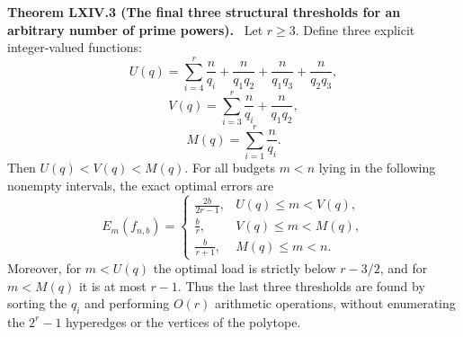 \documentclass[11pt,a4paper,oneside]{book}
\newcommand{\statement}[3]{\par\medskip\noindent\textbf{#1 #2 (#3).}\ }
\begin{document}
\statement{Theorem}{LXIV.3}{The final three structural thresholds for an arbitrary number of prime powers}
Let $r\ge3$. Define three explicit integer-valued functions:
\begin{equation}
U(q)=\sum_{i=4}^r\frac n{q_i}+\frac n{q_1q_2}+\frac n{q_1q_3}+\frac n{q_2q_3},\tag{415}
\end{equation}
\begin{equation}
V(q)=\sum_{i=3}^r\frac n{q_i}+\frac n{q_1q_2},\tag{416}
\end{equation}
\begin{equation}
M(q)=\sum_{i=1}^r\frac n{q_i}.\tag{417}
\end{equation}
Then $U(q)<V(q)<M(q)$. For all budgets $m<n$ lying in the following nonempty intervals, the exact optimal errors are
\begin{equation}
E_m(f_{n,b})=\begin{cases}
\displaystyle\frac{2b}{2r-1},&U(q)\le m<V(q),\\[5pt]
\displaystyle\frac b r,&V(q)\le m<M(q),\\[5pt]
\displaystyle\frac b{r+1},&M(q)\le m<n.
\end{cases}\tag{418}
\end{equation}
Moreover, for $m<U(q)$ the optimal load is strictly below $r-3/2$, and for $m<M(q)$ it is at most $r-1$. Thus the last three thresholds are found by sorting the $q_i$ and performing $O(r)$ arithmetic operations, without enumerating the $2^r-1$ hyperedges or the vertices of the polytope.
\end{document}
